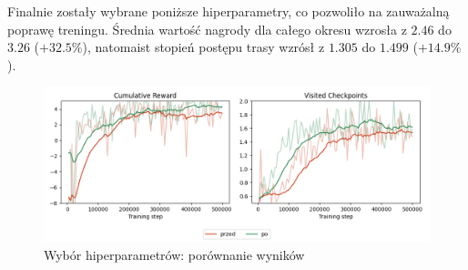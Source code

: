 Finalnie zostały wybrane poniższe hiperparametry, co pozwoliło na zauważalną poprawę treningu. Średnia wartość nagrody dla całego okresu wzrosła z $2.46$ do $3.26$ ($+32.5\%$), natomaist stopień postępu trasy wzrósł z $1.305$ do $1.499$ ($+14.9\%$).
\begin{figure}[H]
    \centering
    \includegraphics[width=\textwidth]{graphs/hyperparameters_tuning_results.png}
    \caption{Wybór hiperparametrów: porównanie wyników}
    \label{fig}
\end{figure}
\clearpage
